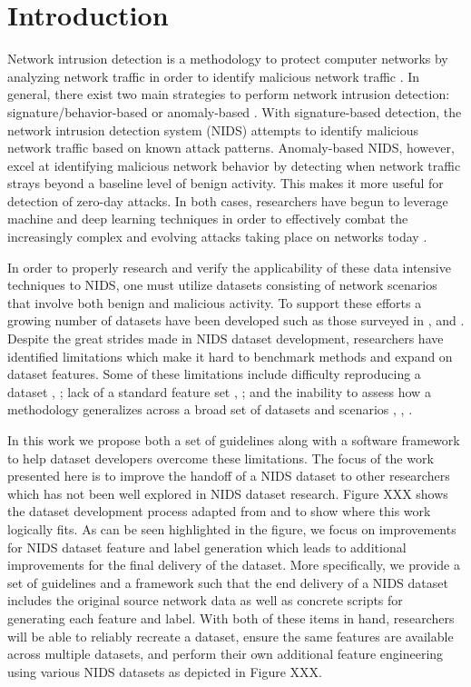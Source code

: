 \documentclass[conference]{IEEEtran}
\begin{document}
\section{Introduction}

Network intrusion detection is a methodology to protect computer networks by analyzing network traffic in order to identify malicious network traffic \cite{Chou2022}.
In general, there exist two main strategies to perform network intrusion detection:  signature/behavior-based or anomaly-based \cite{yang2022systematic}.
With signature-based detection, the network intrusion detection system (NIDS) attempts to identify malicious network traffic based on known attack patterns.
Anomaly-based NIDS, however, excel at identifying malicious network behavior by detecting when network traffic strays beyond a baseline level of benign activity.
This makes it more useful for detection of zero-day attacks.
In both cases, researchers have begun to leverage machine and deep learning techniques in order to effectively combat the increasingly complex and evolving attacks taking place on networks today \cite{yang2022systematic}.

In order to properly research and verify the applicability of these data intensive techniques to NIDS, one must utilize datasets consisting of network scenarios that involve both benign and malicious activity.
To support these efforts a growing number of datasets have been developed such as those surveyed in \cite{ring2019survey}, \cite{Chou2022} and \cite{yang2022systematic}.
Despite the great strides made in NIDS dataset development, researchers have identified limitations which make it hard to benchmark methods and expand on dataset features.
Some of these limitations include difficulty reproducing a dataset \cite{ferriyan2021}, \cite{Chou2022}; lack of a standard feature set \cite{sarhan_arxiv2021}, \cite{Sarhan2021}; and the inability to assess how a methodology generalizes across a broad set of datasets and scenarios \cite{sarhan2020netflow}, \cite{Sarhan2021}, \cite{wolsing2021ipal}.

In this work we propose both a set of guidelines along with a software framework to help dataset developers overcome these limitations.
The focus of the work presented here is to improve the handoff of a NIDS dataset to other researchers which has not been well explored in NIDS dataset research.
Figure XXX shows the dataset development process adapted from \cite{sarhan_arxiv2021} and \cite{e23111532} to show where this work logically fits. 
As can be seen highlighted in the figure, we focus on improvements for NIDS dataset feature and label generation which leads to additional improvements for the final delivery of the dataset.
More specifically, we provide a set of guidelines and a framework such that the end delivery of a NIDS dataset includes the original source network data as well as concrete scripts for generating each feature and label.
With both of these items in hand, researchers will be able to reliably recreate a dataset, ensure the same features are available across multiple datasets, and perform their own additional feature engineering using various NIDS datasets as depicted in Figure XXX.
\end{document}
